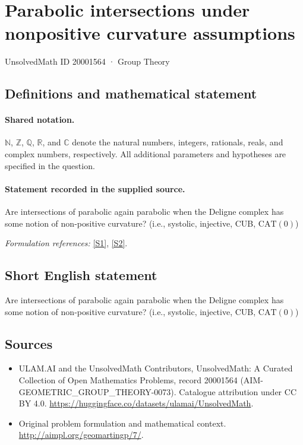 \documentclass[11pt]{article}
\newcommand{\sref}[2]{\hyperlink{source:#1:#2}{[S#2]}}
\begin{document}
\setcounter{section}{20001563}
\section{Parabolic intersections under nonpositive curvature assumptions}\label{20001564}
{\small UnsolvedMath ID 20001564 · Group Theory}
\subsection{Definitions and mathematical statement}

\paragraph{Shared notation.}$\mathbb N$, $\mathbb Z$, $\mathbb Q$, $\mathbb R$, and $\mathbb C$ denote the natural numbers, integers, rationals, reals, and complex numbers, respectively. All additional parameters and hypotheses are specified in the question.


\paragraph{Statement recorded in the supplied source.}
Are intersections of parabolic again parabolic when the Deligne complex has some notion of non-positive curvature? (i.e., systolic, injective, CUB, $\mathrm{CAT}(0)$)
\par\smallskip\textit{Formulation references:} \sref{20001564}{1}, \sref{20001564}{2}.
\subsection{Short English statement}
Are intersections of parabolic again parabolic when the Deligne complex has some notion of non-positive curvature? (i.e., systolic, injective, CUB, $\mathrm{CAT}(0)$)
\subsection{Sources}
\begin{itemize}
\item[\hypertarget{source:20001564:1}{S1}] ULAM.AI and the UnsolvedMath Contributors, UnsolvedMath: A Curated Collection of Open Mathematics Problems, record 20001564 (AIM-GEOMETRIC\_GROUP\_THEORY-0073). Catalogue attribution under CC BY 4.0.
\url{https://huggingface.co/datasets/ulamai/UnsolvedMath}.
\item[\hypertarget{source:20001564:2}{S2}] Original problem formulation and mathematical context.
\url{http://aimpl.org/geomartingp/7/}.
\end{itemize}
\label{end:20001564}
\end{document}
